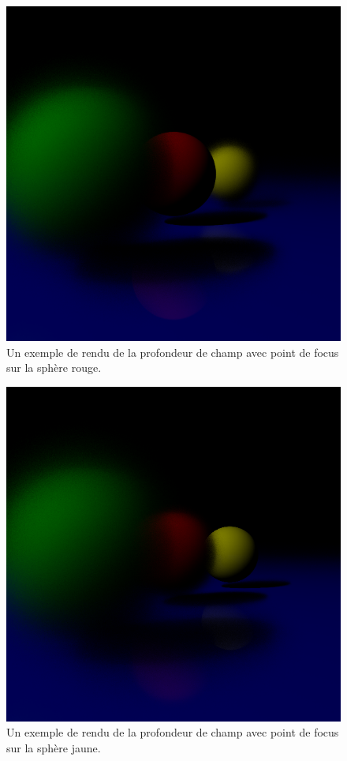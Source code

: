 \begin{figure}[h]
  \includegraphics[width=\textwidth, keepaspectratio=true]{../../diary/18.png}
  \caption{Un exemple de rendu de la profondeur de champ avec point de focus
  sur la sphère rouge.}
\end{figure}

\begin{figure}[h]
  \includegraphics[width=\textwidth, keepaspectratio=true]{../../diary/19.png}
  \caption{Un exemple de rendu de la profondeur de champ avec point de focus
  sur la sphère jaune.}
\end{figure}

